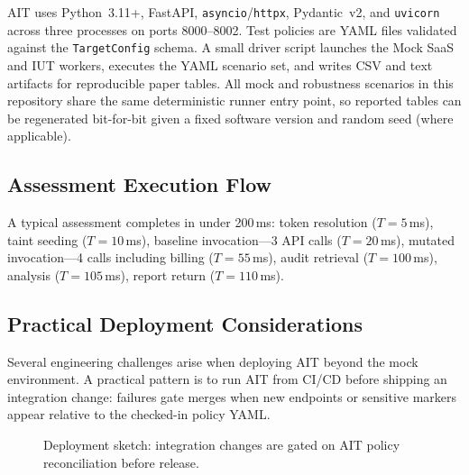 \documentclass[conference]{IEEEtran}
\begin{document}
AIT uses Python~3.11+, FastAPI, \texttt{asyncio}/\texttt{httpx},
Pydantic~v2, and \texttt{uvicorn} across three processes on ports
8000--8002. Test policies are YAML files validated against the
\texttt{TargetConfig} schema. A small driver script launches the Mock
SaaS and IUT workers, executes the YAML scenario set, and writes CSV
and text artifacts for reproducible paper tables.
All mock and robustness scenarios in this repository share the same
deterministic runner entry point, so reported tables can be regenerated
bit-for-bit given a fixed software version and random seed (where
applicable).

\subsection{Assessment Execution Flow}

A typical assessment completes in under 200\,ms: token resolution
($T=5$\,ms), taint seeding ($T=10$\,ms), baseline invocation---3
API calls ($T=20$\,ms), mutated invocation---4 calls including billing
($T=55$\,ms), audit retrieval ($T=100$\,ms), analysis ($T=105$\,ms),
report return ($T=110$\,ms).

\subsection{Practical Deployment Considerations}
\label{sec:deployment}

Several engineering challenges arise when deploying AIT beyond the
mock environment. A practical pattern is to run AIT from CI/CD before
shipping an integration change: failures gate merges when new endpoints
or sensitive markers appear relative to the checked-in policy YAML.

\begin{figure}[htbp]
  \centering
  \caption{Deployment sketch: integration changes are gated on AIT policy
  reconciliation before release.}
  \label{fig:cicd}
\end{figure}
\end{document}
